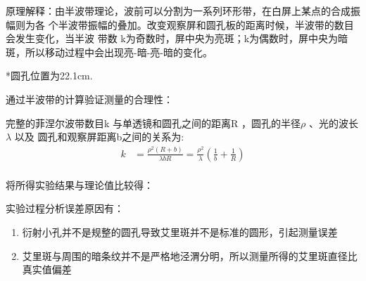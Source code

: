 \documentclass[12pt,a4paper,UTF8]{ctexart}
\begin{document}
原理解释：由半波带理论，波前可以分割为一系列环形带，在白屏上某点的合成振幅则为各
个半波带振幅的叠加。改变观察屏和圆孔板的距离时候，半波带的数目会发生变化，当半波
带数 k为奇数时，屏中央为亮斑；k为偶数时，屏中央为暗斑，所以移动过程中会出现亮-暗-亮-暗的变化。

\begin{table}[htbp]
	\centering
	  \caption{菲涅尔衍射实验数据}
	\label{tab:3}%
  \end{table}
  *圆孔位置为22.1cm.
  
  通过半波带的计算验证测量的合理性：

  完整的菲涅尔波带数目k 与单透镜和圆孔之间的距离R ，圆孔的半径$\rho $ 、光的波长$\lambda$ 以及
  圆孔和观察屏距离b之间的关系为:
  \begin{align*}
	  k&=\frac{\rho^2(R+b)}{\lambda b R}
	   =\frac{\rho^2}{\lambda}\left(\frac{1}{b}+\frac{1}{R}\right)\\
  \end{align*}

将所得实验结果与理论值比较得：
\begin{table}[htbp]
	\centering
	  \caption{菲涅尔衍射实验值与理论值比较}
	\label{tab:4}%
  \end{table}


  实验过程分析误差原因有：
\begin{enumerate}
	\item 衍射小孔并不是规整的圆孔导致艾里斑并不是标准的圆形，引起测量误差
	\item 艾里斑与周围的暗条纹并不是严格地泾渭分明，所以测量所得的艾里斑直径比真实值偏差
\end{enumerate}
\end{document}
